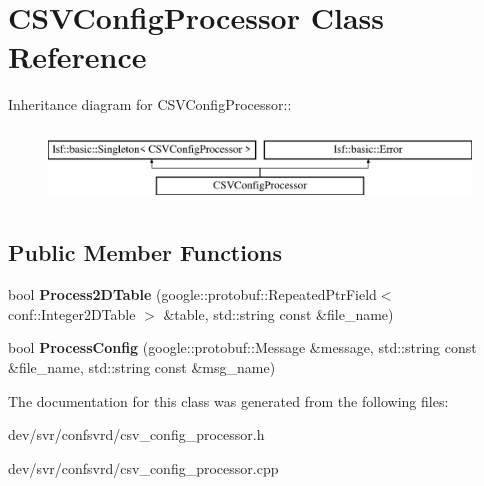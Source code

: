 \hypertarget{classCSVConfigProcessor}{
\section{CSVConfigProcessor Class Reference}
\label{classCSVConfigProcessor}
}
Inheritance diagram for CSVConfigProcessor::\begin{figure}[H]
\begin{center}
\leavevmode
\includegraphics[height=2cm]{classCSVConfigProcessor}
\end{center}
\end{figure}
\subsection*{Public Member Functions}
\begin{DoxyCompactItemize}
\item 
\hypertarget{classCSVConfigProcessor_a9ee1de52f7e1729791306fd86260ab8f}{
bool {\bfseries Process2DTable} (google::protobuf::RepeatedPtrField$<$ conf::Integer2DTable $>$ \&table, std::string const \&file\_\-name)}
\label{classCSVConfigProcessor_a9ee1de52f7e1729791306fd86260ab8f}

\item 
\hypertarget{classCSVConfigProcessor_acf06b1fa6f12c3912239ca7740fe7a3f}{
bool {\bfseries ProcessConfig} (google::protobuf::Message \&message, std::string const \&file\_\-name, std::string const \&msg\_\-name)}
\label{classCSVConfigProcessor_acf06b1fa6f12c3912239ca7740fe7a3f}

\end{DoxyCompactItemize}


The documentation for this class was generated from the following files:\begin{DoxyCompactItemize}
\item 
dev/svr/confsvrd/csv\_\-config\_\-processor.h\item 
dev/svr/confsvrd/csv\_\-config\_\-processor.cpp\end{DoxyCompactItemize}
